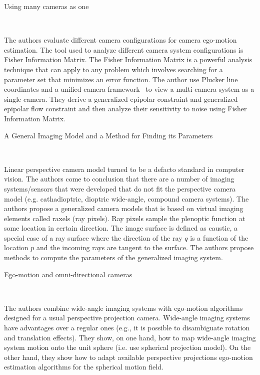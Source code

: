 \documentclass[10pt]{article}         %
\begin{document}
\begin{enumerate}
  {\Large \item Using many cameras as one}~\cite{pless2003using}
  
  The authors evaluate different camera configurations for camera
  ego-motion estimation.  The tool used to analyze different camera
  system configurations is Fisher Information Matrix.  The Fisher
  Information Matrix is a powerful analysis technique that can apply
  to any problem which involves searching for a parameter set that
  minimizes an error function.  The author use Plucker line
  coordinates and a unified camera
  framework~\cite{grossberg2001general} to view a multi-camera system
  as a single camera.  They derive a generalized epipolar constraint
  and generalized epipolar flow constraint and then analyze their
  sensitivity to noise using Fisher Information Matrix.

  {\Large \item A General Imaging Model and a Method for Finding its
    Parameters}~\cite{grossberg2001general}

  Linear perspective camera model turned to be a defacto standard in
  computer vision.  The authors come to conclusion that there are a
  number of imaging systems/sensors that were developed that do not
  fit the perspective camera model (e.g. cathadioptric, dioptric
  wide-angle, compound camera systems).  The authors propose a
  generalized camera models that is based on virtual imaging elements
  called raxels (ray pixels).  Ray pixels sample the plenoptic
  function at some location in certain direction.  The image surface
  is defined as caustic, a special case of a ray surface where the
  direction of the ray $q$ is a function of the location $p$ and the
  incoming rays are tangent to the surface.  The authors propose
  methods to compute the parameters of the generalized imaging system.

  {\Large \item Ego-motion and omni-directional
    cameras}~\cite{gluckman1998ego}

  The authors combine wide-angle imaging systems with ego-motion
  algorithms designed for a usual perspective projection camera.
  Wide-angle imaging systems have advantages over a regular ones
  (e.g., it is possible to disambiguate rotation and translation
  effects). They show, on one hand, how to map wide-angle imaging
  system motion onto the unit sphere (i.e. use spherical projection
  model). On the other hand, they show how to adapt available
  perspective projections ego-motion estimation algorithms for the
  spherical motion field.


\end{enumerate}
\end{document}
